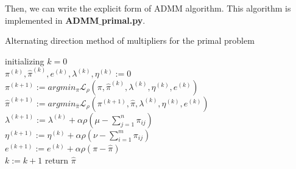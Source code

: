 \documentclass{article}
\begin{document}
\begin{large}
Then, we can write the explicit form of ADMM algorithm. This algorithm is implemented in \textbf{ADMM$\_$primal.py}.

\begin{algorithm}[H]
  \SetAlgoNoLine
  \caption{Alternating direction method of multipliers for the primal problem} 
  initializing $k = 0$\\
  $\pi^{(k)},\hat{\pi}^{(k)},e^{(k)},\lambda^{(k)},\eta^{(k)}:=0$\\
  {  
   $\pi^{(k+1)}:=argmin_{\pi}\mathcal{L}_{\rho}(\pi,\hat{\pi}^{(k)},\lambda^{(k)},\eta^{(k)},e^{(k)})$\\
   $\hat{\pi}^{(k+1)}:=argmin_{\hat{\pi}}\mathcal{L}_{\rho}(\pi^{(k+1)},\hat{\pi},\lambda^{(k)},\eta^{(k)},e^{(k)})$\\
   $\lambda^{(k+1)}:=\lambda^{(k)}+\alpha\rho(\mu-\sum_{j=1}^{n}\pi_{ i j })$\\
   $\eta^{(k+1)}:=\eta^{(k)}+\alpha\rho(\nu-\sum_{i=1}^{m}\pi_{ i j })$\\
   $e^{(k+1)}:=e^{(k)}+\alpha\rho(\pi-\hat{\pi})$\\
   $k:= k+1$
  }
  return $\hat{\pi}$
\end{algorithm}


\end{large}
\end{document}
